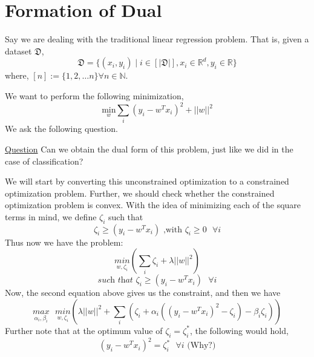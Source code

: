 \section{Formation of Dual}
Say we are dealing with the traditional linear regression problem. That is, given a dataset $\mathfrak{D}$,
\[\mathfrak{D} = \{(x_i,y_i) \mid i \in [|\mathfrak{D}|], x_i \in \mathbb{R}^d, y_i \in \mathbb{R}\}\]
where, $[n] := \{1,2, \dots n\} \forall n \in \mathbb{N}$.


We want to perform the following minimization,
\[\underset{{w}}{\text{min}}\sum_{i}(y_i - {w}^Tx_i)^2 + ||w||^2\]
We ask the following question.
\begin{center}
    \underline{Question} Can we obtain the dual form of this problem, just like we did in the case of classification?
\end{center}
We will start by converting this unconstrained optimization to a constrained optimization problem. Further, we should check whether the constrained optimization problem is convex.
With the idea of minimizing each of the square terms in mind, we define $\zeta_i$ such that
\[\zeta_i \geq (y_i - w^Tx_i) \text{ ,with } \zeta_i \geq 0 \text{ } \forall i\]
Thus now we have the problem:
\[\underset{w,\zeta_i}{min}(\sum_i\zeta_i + \lambda||w||^2)\]
\[\textit{such that } \zeta_i \geq (y_i - w^Tx_i) \text{ } \forall i\]
Now, the second equation above gives us the constraint, and then we have
\[\underset{\alpha_i,\beta_i}{max}\text{ }\underset{w,\zeta_i}{min}\left(\lambda||w||^2 + \sum_i(\zeta_i + \alpha_i((y_i - w^Tx_i)^2 - \zeta_i) - \beta_i\zeta_i)\right)\]
Further note that at the optimum value of $\zeta_i = \zeta_i^*$, the following would hold,
\[(y_i - w^Tx_i)^2 = \zeta_i^* \text{ } \forall i \text{   (Why?)}\]
